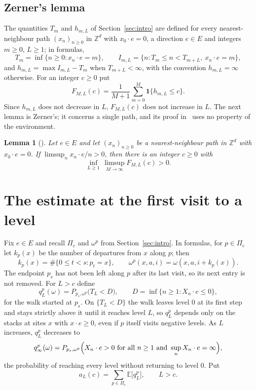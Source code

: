 \documentclass[11pt]{amsart}
\newtheorem{lemma}[theorem]{Lemma}
\theoremstyle{remark}
\newcommand{\Z}{\mathbb{Z}}
\newcommand{\E}{\mathbb{E}}
\begin{document}
\subsection{Zerner's lemma}
The quantities $T_m$ and $h_{m,L}$ of Section~\ref{sec:intro} are defined for every nearest-neighbour path
$(x_n)_{n\ge0}$ in $\Z^d$ with $x_0\cdot e=0$, a direction $e\in E$ and integers $m\ge0$, $L\ge1$; in formulas,
\[
T_m=\inf\{n\ge0:x_n\cdot e=m\},\qquad I_{m,L}=\{n:T_m\le n<T_{m+L},\ x_n\cdot e=m\},
\]
and $h_{m,L}=\max I_{m,L}-T_m$ when $T_{m+L}<\infty$, with the convention $h_{m,L}=\infty$ otherwise. For an integer
$c\ge0$ put
\[
F_{M,L}(c)=\frac1{M+1}\sum_{m=0}^{M}\mathbf 1\{h_{m,L}\le c\}.
\]
Since $h_{m,L}$ does not decrease in $L$, $F_{M,L}(c)$ does not increase in $L$. The next lemma is Zerner's; it
concerns a single path, and its proof in~\cite{Zer02} uses no property of the environment.

\begin{lemma}[{\cite[Lemma 3]{Zer02}}]\label{lem:counting}
Let $e\in E$ and let $(x_n)_{n\ge0}$ be a nearest-neighbour path in $\Z^d$ with $x_0\cdot e=0$. If
$\limsup_n x_n\cdot e/n>0$, then there is an integer $c\ge0$ with
\[
\inf_{L\ge1}\,\limsup_{M\to\infty}F_{M,L}(c)>0 .
\]
\end{lemma}

\section{The estimate at the first visit to a level}\label{sec:fresh}

Fix $e\in E$ and recall $\Pi_c$ and $\omega^p$ from Section~\ref{sec:intro}. In formulas, for $p\in\Pi_c$ let $k_p(x)$
be the number of departures from $x$ along $p$; then
\[
k_p(x)=\#\{0\le t<s:p_t=x\},\qquad \omega^p(x,a,i)=\omega(x,a,i+k_p(x)).
\]
The endpoint $p_s$ has not been left along $p$ after its last visit, so its next entry is not removed. For $L>c$ define
\[
q_L^p(\omega)=P_{p_s,\omega^p}\bigl(T_L<D\bigr),\qquad D=\inf\{n\ge1:X_n\cdot e\le0\},
\]
for the walk started at $p_s$. On $\{T_L<D\}$ the walk leaves level $0$ at
its first step and stays strictly above it until it reaches level $L$, so $q_L^p$ depends only on the stacks at sites
$x$ with $x\cdot e\ge0$, even if $p$ itself visits negative levels. As $L$ increases, $q_L^p$ decreases to
\[
q_\infty^p(\omega)=P_{p_s,\omega^p}\Bigl(X_n\cdot e>0\text{ for all }n\ge1\text{ and }\sup_nX_n\cdot e=\infty\Bigr),
\]
the probability of reaching every level without returning to level $0$. Put
\[
a_L(c)=\sum_{p\in\Pi_c}\E\bigl[q_L^p\bigr],\qquad L>c .
\]
\end{document}
